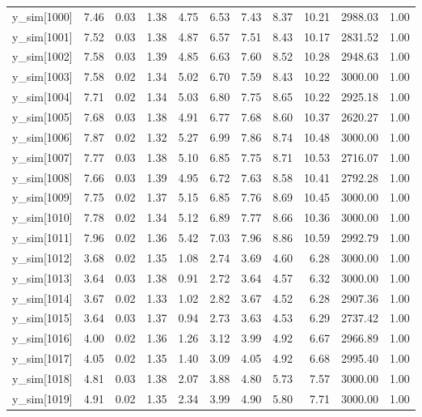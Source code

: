 \begin{table}[ht]
\begin{tabular}{rrrrrrrrrrr}
  y\_sim[1000] & 7.46 & 0.03 & 1.38 & 4.75 & 6.53 & 7.43 & 8.37 & 10.21 & 2988.03 & 1.00 \\ 
  y\_sim[1001] & 7.52 & 0.03 & 1.38 & 4.87 & 6.57 & 7.51 & 8.43 & 10.17 & 2831.52 & 1.00 \\ 
  y\_sim[1002] & 7.58 & 0.03 & 1.39 & 4.85 & 6.63 & 7.60 & 8.52 & 10.28 & 2948.63 & 1.00 \\ 
  y\_sim[1003] & 7.58 & 0.02 & 1.34 & 5.02 & 6.70 & 7.59 & 8.43 & 10.22 & 3000.00 & 1.00 \\ 
  y\_sim[1004] & 7.71 & 0.02 & 1.34 & 5.03 & 6.80 & 7.75 & 8.65 & 10.22 & 2925.18 & 1.00 \\ 
  y\_sim[1005] & 7.68 & 0.03 & 1.38 & 4.91 & 6.77 & 7.68 & 8.60 & 10.37 & 2620.27 & 1.00 \\ 
  y\_sim[1006] & 7.87 & 0.02 & 1.32 & 5.27 & 6.99 & 7.86 & 8.74 & 10.48 & 3000.00 & 1.00 \\ 
  y\_sim[1007] & 7.77 & 0.03 & 1.38 & 5.10 & 6.85 & 7.75 & 8.71 & 10.53 & 2716.07 & 1.00 \\ 
  y\_sim[1008] & 7.66 & 0.03 & 1.39 & 4.95 & 6.72 & 7.63 & 8.58 & 10.41 & 2792.28 & 1.00 \\ 
  y\_sim[1009] & 7.75 & 0.02 & 1.37 & 5.15 & 6.85 & 7.76 & 8.69 & 10.45 & 3000.00 & 1.00 \\ 
  y\_sim[1010] & 7.78 & 0.02 & 1.34 & 5.12 & 6.89 & 7.77 & 8.66 & 10.36 & 3000.00 & 1.00 \\ 
  y\_sim[1011] & 7.96 & 0.02 & 1.36 & 5.42 & 7.03 & 7.96 & 8.86 & 10.59 & 2992.79 & 1.00 \\ 
  y\_sim[1012] & 3.68 & 0.02 & 1.35 & 1.08 & 2.74 & 3.69 & 4.60 & 6.28 & 3000.00 & 1.00 \\ 
  y\_sim[1013] & 3.64 & 0.03 & 1.38 & 0.91 & 2.72 & 3.64 & 4.57 & 6.32 & 3000.00 & 1.00 \\ 
  y\_sim[1014] & 3.67 & 0.02 & 1.33 & 1.02 & 2.82 & 3.67 & 4.52 & 6.28 & 2907.36 & 1.00 \\ 
  y\_sim[1015] & 3.64 & 0.03 & 1.37 & 0.94 & 2.73 & 3.63 & 4.53 & 6.29 & 2737.42 & 1.00 \\ 
  y\_sim[1016] & 4.00 & 0.02 & 1.36 & 1.26 & 3.12 & 3.99 & 4.92 & 6.67 & 2966.89 & 1.00 \\ 
  y\_sim[1017] & 4.05 & 0.02 & 1.35 & 1.40 & 3.09 & 4.05 & 4.92 & 6.68 & 2995.40 & 1.00 \\ 
  y\_sim[1018] & 4.81 & 0.03 & 1.38 & 2.07 & 3.88 & 4.80 & 5.73 & 7.57 & 3000.00 & 1.00 \\ 
  y\_sim[1019] & 4.91 & 0.02 & 1.35 & 2.34 & 3.99 & 4.90 & 5.80 & 7.71 & 3000.00 & 1.00 \\ 

\end{tabular}
\end{table}
